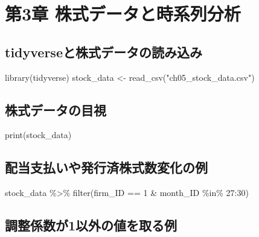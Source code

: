 \documentclass[
  letterpaper,
  DIV=11,
  numbers=noendperiod]{scrreprt}
\newenvironment{Shaded}{\begin{snugshade}}{\end{snugshade}}
\newcommand{\DecValTok}[1]{\textcolor[rgb]{0.68,0.00,0.00}{#1}}
\newcommand{\FunctionTok}[1]{\textcolor[rgb]{0.28,0.35,0.67}{#1}}
\newcommand{\NormalTok}[1]{\textcolor[rgb]{0.00,0.23,0.31}{#1}}
\newcommand{\OtherTok}[1]{\textcolor[rgb]{0.00,0.23,0.31}{#1}}
\newcommand{\SpecialCharTok}[1]{\textcolor[rgb]{0.37,0.37,0.37}{#1}}
\newcommand{\StringTok}[1]{\textcolor[rgb]{0.13,0.47,0.30}{#1}}
\begin{document}
\chapter{第3章
株式データと時系列分析}\label{ux7b2c3ux7ae0-ux682aux5f0fux30c7ux30fcux30bfux3068ux6642ux7cfbux5217ux5206ux6790}

\section{tidyverseと株式データの読み込み}\label{tidyverseux3068ux682aux5f0fux30c7ux30fcux30bfux306eux8aadux307fux8fbcux307f}

\begin{Shaded}
\begin{Highlighting}[]
\FunctionTok{library}\NormalTok{(tidyverse)}
\NormalTok{stock\_data }\OtherTok{\textless{}{-}} \FunctionTok{read\_csv}\NormalTok{(}\StringTok{"ch05\_stock\_data.csv"}\NormalTok{)}
\end{Highlighting}
\end{Shaded}

\section{株式データの目視}\label{ux682aux5f0fux30c7ux30fcux30bfux306eux76eeux8996}

\begin{Shaded}
\begin{Highlighting}[]
\FunctionTok{print}\NormalTok{(stock\_data)}
\end{Highlighting}
\end{Shaded}

\section{配当支払いや発行済株式数変化の例}\label{ux914dux5f53ux652fux6255ux3044ux3084ux767aux884cux6e08ux682aux5f0fux6570ux5909ux5316ux306eux4f8b}

\begin{Shaded}
\begin{Highlighting}[]
\NormalTok{stock\_data }\SpecialCharTok{\%\textgreater{}\%} 
  \FunctionTok{filter}\NormalTok{(firm\_ID }\SpecialCharTok{==} \DecValTok{1} \SpecialCharTok{\&}\NormalTok{ month\_ID }\SpecialCharTok{\%in\%} \DecValTok{27}\SpecialCharTok{:}\DecValTok{30}\NormalTok{)}
\end{Highlighting}
\end{Shaded}

\section{調整係数が1以外の値を取る例}\label{ux8abfux6574ux4fc2ux6570ux304c1ux4ee5ux5916ux306eux5024ux3092ux53d6ux308bux4f8b}
\end{document}
